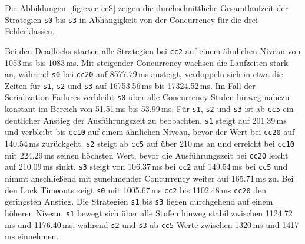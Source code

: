 

Die Abbildungen~\ref{fig:exec-ccS} zeigen die durchschnittliche Gesamtlaufzeit der Strategien \texttt{s0} bis
\texttt{s3} in Abhängigkeit von der Concurrency für die drei Fehlerklassen.

Bei den Deadlocks starten alle Strategien bei \texttt{cc2} auf einem ähnlichen Niveau von 1053\,ms bis 1083\,ms.
Mit steigender Concurrency wachsen die Laufzeiten stark an, während \texttt{s0} bei \texttt{cc20} auf 8577.79\,ms
ansteigt, verdoppeln sich in etwa die Zeiten für \texttt{s1}, \texttt{s2} und \texttt{s3} auf 16753.56\,ms bis 17324.52\,ms.
Im Fall der Serialization Failures verbleibt \texttt{s0} über alle Concurrency-Stufen hinweg nahezu konstant im
Bereich von 51.51\,ms bis 53.99\,ms.
Für \texttt{s1}, \texttt{s2} und \texttt{s3} ist ab \texttt{cc5} ein deutlicher Anstieg der Ausführungszeit zu
beobachten.
\texttt{s1} steigt auf 201.39\,ms und verbleibt bis \texttt{cc10} auf einem ähnlichen Niveau, bevor der Wert bei
\texttt{cc20} auf 140.54\,ms zurückgeht.
\texttt{s2} steigt ab \texttt{cc5} auf über 210\,ms an und erreicht bei \texttt{cc10} mit 224.29\,ms seinen höchsten
Wert, bevor die Ausführungszeit bei \texttt{cc20} leicht auf 210.09\,ms sinkt.
\texttt{s3} steigt von 106.37\,ms bei \texttt{cc2} auf 149.54\,ms bei \texttt{cc5} und nimmt anschließend mit
zunehmender Concurrency weiter auf 165.71\,ms zu.
Bei den Lock Timeouts zeigt \texttt{s0} mit 1005.67\,ms \texttt{cc2} bis 1102.48\,ms \texttt{cc20} den geringsten
Anstieg.
Die Strategien \texttt{s1} bis \texttt{s3} liegen durchgehend auf einem höheren Niveau.
\texttt{s1} bewegt sich über alle Stufen hinweg stabil zwischen 1124.72\,ms und 1176.40\,ms, während \texttt{s2}
und \texttt{s3} ab \texttt{cc5} Werte zwischen 1320\,ms und 1417\,ms einnehmen.